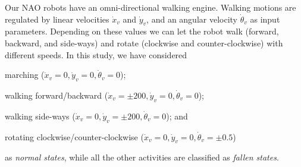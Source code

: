 \documentclass{IEEEtran}
\begin{document}
Our NAO robots have an omni-directional walking engine.  
Walking motions are regulated by linear velocities $\dot{x}_v$ and $\dot{y}_v$, and an 
angular velocity $\dot{\theta}_v$ as input parameters. Depending on these
values we can let the robot walk (forward, backward, and side-ways) and rotate (clockwise and
counter-clockwise) with different speeds. In this study, we have considered \begin{inparaenum}[($i$)]
\item marching ($\dot{x}_v = 0 , \dot{y}_v = 0, \dot{\theta}_v = 0$); \item walking  
forward/backward ($\dot{x}_v = \pm200
, \dot{y}_v = 0, \dot{\theta}_v = 0$);  \item walking side-ways ($\dot{x}_v = 0, \dot{y}_v = 
\pm200, \dot{\theta}_v = 0$); and  \item rotating clockwise/counter-clockwise
($\dot{x}_v = 0 , \dot{y}_v = 0, \dot{\theta}_v = \pm 0.5$) \end{inparaenum} as {\em normal states}, 
while all the other activities are classified as {\em fallen states}. 

\begin{table}[!ht]
\caption{Logistic regression  and SVM classification for robot activities.}
	\label{tab:robot-logistic-class}
	\centering
\end{table}
\end{document}
